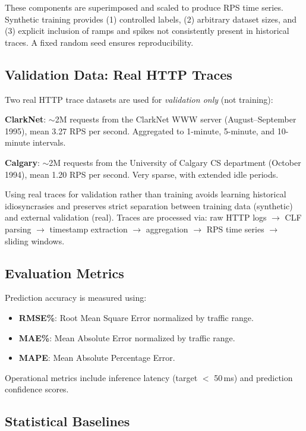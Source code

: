 \documentclass[conference,letterpaper]{IEEEtran}
\begin{document}
These components are superimposed and scaled to produce RPS time series. Synthetic training provides (1) controlled labels, (2) arbitrary dataset sizes, and (3) explicit inclusion of ramps and spikes not consistently present in historical traces. A fixed random seed ensures reproducibility.

\subsection{Validation Data: Real HTTP Traces}

Two real HTTP trace datasets are used for \textit{validation only} (not training):

\textbf{ClarkNet}: $\sim$2M requests from the ClarkNet WWW server (August--September 1995), mean 3.27 RPS per second. Aggregated to 1-minute, 5-minute, and 10-minute intervals.

\textbf{Calgary}: $\sim$2M requests from the University of Calgary CS department (October 1994), mean 1.20 RPS per second. Very sparse, with extended idle periods.

Using real traces for validation rather than training avoids learning historical idiosyncrasies and preserves strict separation between training data (synthetic) and external validation (real). Traces are processed via: raw HTTP logs $\rightarrow$ CLF parsing $\rightarrow$ timestamp extraction $\rightarrow$ aggregation $\rightarrow$ RPS time series $\rightarrow$ sliding windows.

\subsection{Evaluation Metrics}

Prediction accuracy is measured using:
\begin{itemize}
    \item \textbf{RMSE\%}: Root Mean Square Error normalized by traffic range.
    \item \textbf{MAE\%}: Mean Absolute Error normalized by traffic range.
    \item \textbf{MAPE}: Mean Absolute Percentage Error.
\end{itemize}

Operational metrics include inference latency (target $<$ 50\,ms) and prediction confidence scores.

\subsection{Statistical Baselines}
\end{document}
